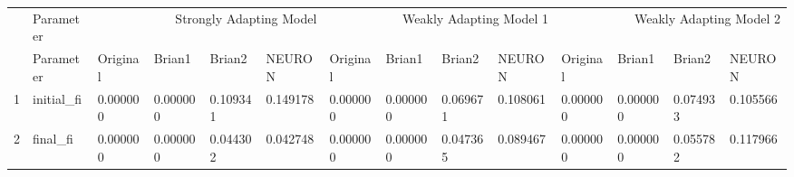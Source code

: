 \begin{tabular}{llllllllllllll}
 & Parameter & \multicolumn{4}{r}{Strongly Adapting Model} & \multicolumn{4}{r}{Weakly Adapting Model 1} & \multicolumn{4}{r}{Weakly Adapting Model 2} \\
 & Parameter & Original & Brian1 & Brian2 & NEURON & Original & Brian1 & Brian2 & NEURON & Original & Brian1 & Brian2 & NEURON \\
1 & initial_fi & 0.000000 & 0.000000 & 0.109341 & 0.149178 & 0.000000 & 0.000000 & 0.069671 & 0.108061 & 0.000000 & 0.000000 & 0.074933 & 0.105566 \\
2 & final_fi & 0.000000 & 0.000000 & 0.044302 & 0.042748 & 0.000000 & 0.000000 & 0.047365 & 0.089467 & 0.000000 & 0.000000 & 0.055782 & 0.117966 \\
\end{tabular}
